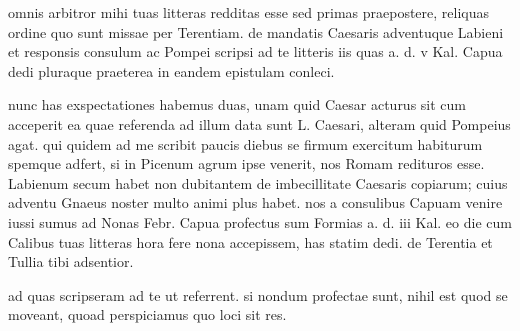 


 omnis arbitror mihi tuas litteras redditas esse sed primas praepostere, reliquas ordine quo sunt missae per Terentiam. de mandatis Caesaris adventuque Labieni et responsis consulum ac Pompei scripsi ad te litteris iis quas a. d. v Kal. Capua dedi pluraque praeterea in eandem epistulam conleci.

 nunc has exspectationes habemus duas, unam quid Caesar acturus sit cum acceperit ea quae referenda ad illum data sunt L. Caesari, alteram quid Pompeius agat. qui quidem ad me scribit paucis diebus se firmum exercitum habiturum spemque adfert, si in Picenum agrum ipse venerit, nos Romam redituros esse. Labienum secum habet non dubitantem de imbecillitate Caesaris copiarum; cuius adventu Gnaeus noster multo animi plus habet. nos a consulibus Capuam venire iussi sumus ad Nonas Febr. Capua profectus sum Formias a. d. iii Kal. eo die cum Calibus tuas litteras hora fere nona accepissem, has statim dedi. de Terentia et Tullia tibi adsentior.

 ad quas scripseram ad te ut referrent. si nondum profectae sunt, nihil est quod se moveant, quoad perspiciamus quo loci sit res.
